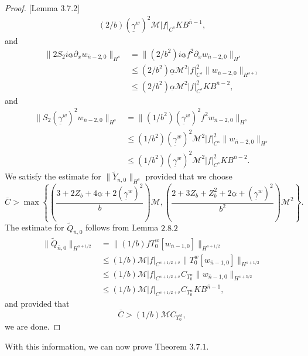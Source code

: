 \begin{proof}{[Lemma 3.7.2]}
\begin{align*}
(2/b)(\underline{\gamma}^w)^2\mathcal{M}|f|_{C^{s}}KB^{\overline{n}-1},
\end{align*}
and
\begin{align*}
\|2S_2i\underline{\alpha}\partial_xw_{\overline{n}-2,0}\|_{H^{s}}&=\|(2/b^2)i\underline{\alpha}f^2\partial_xw_{\overline{n}-2,0}\|_{H^{s}}\\&\le
(2/b^2)\underline{\alpha}\mathcal{M}^2|f|_{C^{s}}^2\|w_{\overline{n}-2, 0}\|_{H^{s+1}}\\&\le
(2/b^2)\underline{\alpha}\mathcal{M}^2|f|_{C^{s}}^2KB^{\overline{n}-2},
\end{align*}
and
\begin{align*}
\|S_2(\underline{\gamma}^w)^2w_{\overline{n}-2,0}\|_{H^{s}}&=\|(1/b^2)(\underline{\gamma}^w)^2f^2w_{\overline{n}-2,0}\|_{H^{s}}\\&\le
(1/b^2)(\underline{\gamma}^w)^2\mathcal{M}^2|f|_{C^{s}}^2\|w_{\overline{n}-2, 0}\|_{H^{s}}\\&\le
(1/b^2)(\underline{\gamma}^w)^2\mathcal{M}^2|f|_{C^{s}}^2KB^{\overline{n}-2}.
\end{align*}
We satisfy the estimate for $\|\tilde{Y}_{\overline{n},0}\|_{H^{s}}$ provided that we choose
$$\overline{C} > \max\left\{\left(\frac{3+2Z_b+4\underline{\alpha}+2(\underline{\gamma}^w)^2}{b}\right)\mathcal{M},\left(\frac{2+3Z_b+{Z^2_b}+2\underline{\alpha}+(\underline{\gamma}^w)^2}{b^2} \right)\mathcal{M}^2    \right\}.$$
The estimate for $\tilde{Q}_{\overline{n},0}$ follows from Lemma $2.8.2$
\begin{align*}
\|\tilde{Q}_{\overline{n},0}\|_{H^{s+1/2}}&=\|(1/b)fT_0^w\left[w_{\overline{n}-1,0}\right]\|_{H^{s+1/2}}\\&\le
(1/b)\mathcal{M}|f|_{C^{s+1/2+\sigma}}\|T_0^w\left[w_{\overline{n}-1,0}\right]\|_{H^{s+1/2}}\\&\le
(1/b)\mathcal{M}|f|_{C^{s+1/2+\sigma}}C_{T_0^w}\|w_{\overline{n}-1,0}\|_{H^{s+3/2}}\\&\le
(1/b)\mathcal{M}|f|_{C^{s+1/2+\sigma}}C_{T_0^w}KB^{\overline{n}-1},
\end{align*}
and provided that
$$\overline{C} > (1/b)\mathcal{M}C_{T_0^w},$$
we are done. 
\end{proof}
\begin{flushleft}
With this information, we can now prove Theorem $3.7.1$.
\end{flushleft}
\vskip 0.1in
